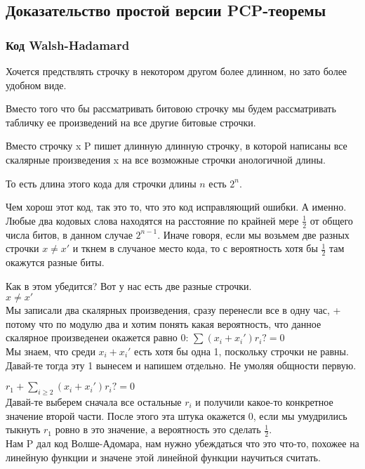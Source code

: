 \subsection{Доказательство простой версии PCP-теоремы}
\subsubsection{Код Walsh-Hadamard}
Хочется предствлять строчку в некотором другом более длинном, 
но зато более удобном виде.

Вместо того что бы рассматривать битовою строчку мы будем
рассматривать табличку ее произведений на все другие битовые строчки.

Вместо строчку x P пишет длинную длинную строчку, в которой написаны все скалярные
произведения x на все возможные строчки анологичной длины.

То есть длина этого кода для строчки длины $n$ есть $2^n$.

Чем хорош этот код, так это то, что это код исправляющий ошибки. А именно.
Любые два кодовых слова находятся на расстояние по крайней мере $\frac12$ от общего
числа битов, в данном случае $2^{n - 1}$. Иначе говоря, если мы возьмем две разных
строчки $x \ne x'$ и ткнем в случаное место кода, то с вероятность хотя бы $\frac{1}{2}$
там окажутся разные биты.

Как в этом убедится? Вот у нас есть две разные строчки.\\  
$x \ne x'$\\

Мы записали два скалярных произведения, сразу перенесли все в одну час, + потому что по модулю два и 
хотим понять какая вероятность, что данное скалярное произведенеи окажется равно 0:
$\sum (x_i + x_i') r_i ?= 0$\\

Мы знаем, что среди $x_i + x_i'$ есть хотя бы одна 1, поскольку строчки не равны. 
Давай-те тогда эту 1 вынесем и напишем отдельно. Не умоляя общности первую. 

$r_1 + \sum_{i \ge 2}(x_i + x_i')r_i ?= 0$\\

Давай-те выберем сначала все остальные $r_i$ и получили какое-то конкретное 
значение второй части. После этого эта штука окажется 0, если мы умудрились тыкнуть $r_1$
ровно в это значение, а вероятность это сделать $\frac12$.\\ 

Нам P дал код Волше-Адомара, нам нужно убеждаться что это что-то, похожее на линейную
функции и значене этой линейной функции научиться считать. 

